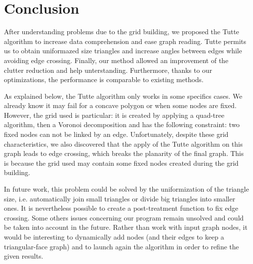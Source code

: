 \chapter*{Conclusion}

After understanding problems due to the grid building, we proposed the Tutte algorithm to increase data comprehension and ease graph reading. Tutte permits us to obtain uniformazed size triangles and increase angles between edges while avoiding edge crossing. 
Finally, our method allowed an improvement of the clutter reduction and help unterstanding. Furthermore, thanks to our optimizations, the performance is comparable to existing methods.


As explained below, the Tutte algorithm only works in some specifics cases. We already know it may fail for a concave polygon or when some nodes are fixed. However, the grid used is particular: it is created by applying a quad-tree algorithm, then a Voronoi decomposition and has the following constraint: two fixed nodes can not be linked by an edge.
Unfortunately, despite these grid characteristics, we also discovered that the apply of the Tutte algorithm on this graph leads to edge crossing, which breaks the planarity of the final graph. This is because the grid used may contain some fixed nodes created during the grid building.


In future work, this problem could be solved by the uniformization of the triangle size, i.e. automatically join small triangles or divide big triangles into smaller ones. It is nevertheless possible to create a post-treatment function to fix edge crossing. 
Some others issues concerning our program remain unsolved and could be taken into account in the future. Rather than work with input graph nodes, it would be interesting to dynamically add nodes (and their edges to keep a triangular-face graph) and to launch again the algorithm in order to refine the given results.

